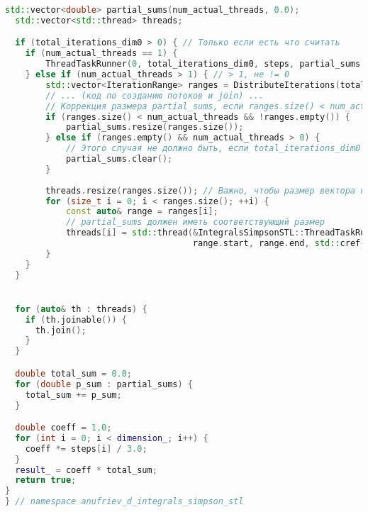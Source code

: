 \documentclass[a4paper,12pt]{article}
\begin{document}
\begin{lstlisting}[language=C++, caption=Ключевые функции из ops\_stl.cpp, basicstyle=\ttfamily\tiny]
  std::vector<double> partial_sums(num_actual_threads, 0.0);
  std::vector<std::thread> threads;

  if (total_iterations_dim0 > 0) { // Только если есть что считать
    if (num_actual_threads == 1) {
        ThreadTaskRunner(0, total_iterations_dim0, steps, partial_sums.data());
    } else if (num_actual_threads > 1) { // > 1, не != 0
        std::vector<IterationRange> ranges = DistributeIterations(total_iterations_dim0, num_actual_threads);
        // ... (код по созданию потоков и join) ...
        // Коррекция размера partial_sums, если ranges.size() < num_actual_threads
        if (ranges.size() < num_actual_threads && !ranges.empty()) {
            partial_sums.resize(ranges.size());
        } else if (ranges.empty() && num_actual_threads > 0) {
            // Этого случая не должно быть, если total_iterations_dim0 > 0 и num_actual_threads > 0
            partial_sums.clear(); 
        }
        
        threads.resize(ranges.size()); // Важно, чтобы размер вектора потоков соответствовал ranges
        for (size_t i = 0; i < ranges.size(); ++i) {
            const auto& range = ranges[i];
            // partial_sums должен иметь соответствующий размер
            threads[i] = std::thread(&IntegralsSimpsonSTL::ThreadTaskRunner, this, 
                                     range.start, range.end, std::cref(steps), &partial_sums[i]);
        }
    }
  }


  for (auto& th : threads) {
    if (th.joinable()) {
      th.join();
    }
  }

  double total_sum = 0.0;
  for (double p_sum : partial_sums) {
    total_sum += p_sum;
  }

  double coeff = 1.0;
  for (int i = 0; i < dimension_; i++) {
    coeff *= steps[i] / 3.0;
  }
  result_ = coeff * total_sum;
  return true;
}
} // namespace anufriev_d_integrals_simpson_stl
\end{lstlisting}

\newpage
\end{document}
